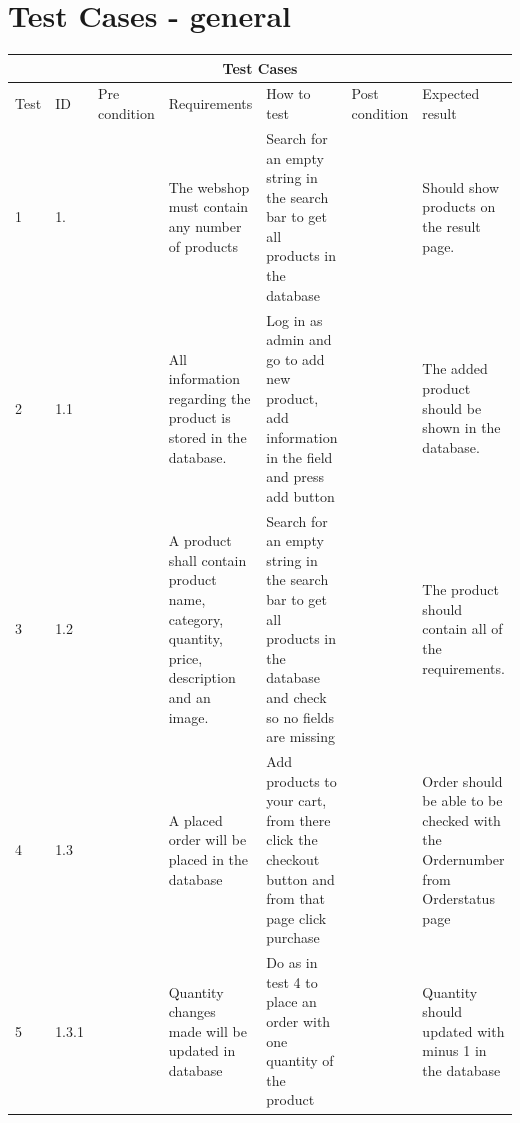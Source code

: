 \documentclass[a4paper,12pt]{article}
\begin{document}
\section{Test Cases - general}

\begin{tabular}{ |p{0.8cm}|p{0.8cm}|p{2.8cm}|p{2.8cm}|p{2.8cm}|p{2.8cm}|p{2.8cm}|}

	\hline
	\multicolumn{7}{|c|}{Test Cases} \\
	\hline
	Test& ID &Pre condition & Requirements &How to test & Post condition &Expected result\\
	\hline
	1 & 1. & &The webshop must contain any number of products    & Search for an empty string in the search bar to get all products in the database & &Should show products on the result page.\\
	\hline
	2  & 1.1 & &All information regarding the product is stored in the database.   & Log in as admin and go to add new product, add information in the field and press add button & &The added product should be shown in the database.\\
	\hline
	3 & 1.2 & &A product shall contain product name, category, quantity, price, description and an image.    &Search for an empty string in the search bar to get all products in the database and check so no fields are missing & &The product should contain all of the requirements.\\
	\hline
	4 & 1.3 & &A placed order will be placed in the database  & Add products to your cart, from there click the checkout button and from that page click purchase&  & Order should be able to be checked with the Ordernumber from Orderstatus page \\
	\hline
	5 & 1.3.1& &Quantity changes made will be updated in database& Do as in test 4 to place an order with one quantity of the product & &Quantity should updated with minus 1 in the database\\
	\hline
\end{tabular}
\end{document}
